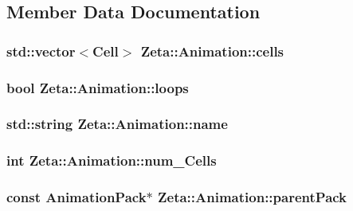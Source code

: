 \subsection{Member Data Documentation}
\hypertarget{classZeta_1_1Animation_aa31ff21bcccd45e09ad6924087e9c1c7}{
\subsubsection[{cells}]{\setlength{\rightskip}{0pt plus 5cm}std\+::vector$<${\bf Cell}$>$ Zeta\+::\+Animation\+::cells\hspace{0.3cm}{\ttfamily [protected]}}}\label{classZeta_1_1Animation_aa31ff21bcccd45e09ad6924087e9c1c7}
\hypertarget{classZeta_1_1Animation_af3097763657c74004f42843fdd6b577b}{
\subsubsection[{loops}]{\setlength{\rightskip}{0pt plus 5cm}bool Zeta\+::\+Animation\+::loops\hspace{0.3cm}{\ttfamily [protected]}}}\label{classZeta_1_1Animation_af3097763657c74004f42843fdd6b577b}
\hypertarget{classZeta_1_1Animation_ac532add4feb3dd5e33f722a8142aedd6}{
\subsubsection[{name}]{\setlength{\rightskip}{0pt plus 5cm}std\+::string Zeta\+::\+Animation\+::name\hspace{0.3cm}{\ttfamily [protected]}}}\label{classZeta_1_1Animation_ac532add4feb3dd5e33f722a8142aedd6}
\hypertarget{classZeta_1_1Animation_a6449ef440e5d9ce97187a00d32b637e5}{
\subsubsection[{num\+\_\+\+Cells}]{\setlength{\rightskip}{0pt plus 5cm}int Zeta\+::\+Animation\+::num\+\_\+\+Cells\hspace{0.3cm}{\ttfamily [protected]}}}\label{classZeta_1_1Animation_a6449ef440e5d9ce97187a00d32b637e5}
\hypertarget{classZeta_1_1Animation_a2cbc0d0aac921dbc343ae864af112559}{
\subsubsection[{parent\+Pack}]{\setlength{\rightskip}{0pt plus 5cm}const {\bf Animation\+Pack}$\ast$ Zeta\+::\+Animation\+::parent\+Pack\hspace{0.3cm}{\ttfamily [protected]}}}\label{classZeta_1_1Animation_a2cbc0d0aac921dbc343ae864af112559}


